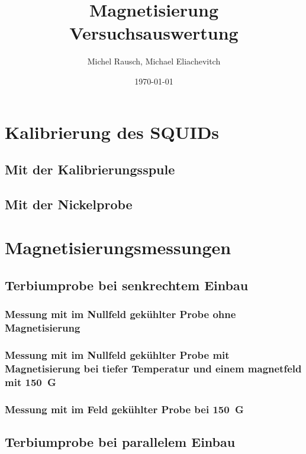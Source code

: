 \documentclass[a4paper,ngerman]{scrartcl}
\title{Magnetisierung\\Versuchsauswertung}
\date{\today}
\author{Michel Rausch, Michael Eliachevitch}
\begin{document}
\maketitle
\tableofcontents
\newpage

\section{Kalibrierung des SQUIDs}

\subsection*{Mit der Kalibrierungsspule}

\subsection*{Mit der Nickelprobe}



\section{Magnetisierungsmessungen}


\subsection{Terbiumprobe bei senkrechtem Einbau}

\subsubsection*{Messung mit im Nullfeld gekühlter Probe ohne Magnetisierung}

\subsubsection*{Messung mit im Nullfeld gekühlter Probe mit Magnetisierung bei tiefer Temperatur und einem magnetfeld mit \SI{150}{G}}

\subsubsection*{Messung mit im Feld gekühlter Probe bei \SI{150}{G}}




\subsection{Terbiumprobe bei parallelem Einbau}
\end{document}
